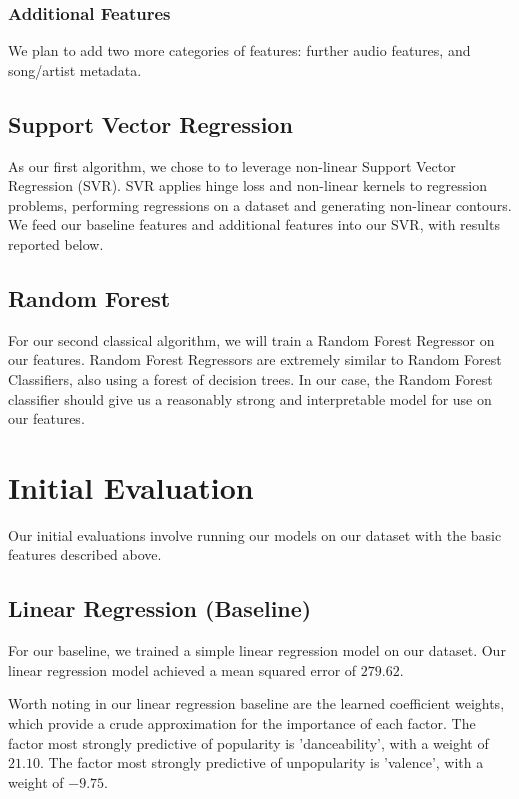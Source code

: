 \documentclass[journal]{IEEEtran}
\begin{document}
\subsubsection{Additional Features}
We plan to add two more categories of features: further audio features, and song/artist metadata.

\subsection{Support Vector Regression}
As our first algorithm, we chose to to leverage non-linear Support Vector Regression (SVR). SVR applies hinge loss and non-linear kernels to regression problems, performing regressions on a dataset and generating non-linear contours. We feed our baseline features and additional features into our SVR, with results reported below.

\subsection{Random Forest}
For our second classical algorithm, we will train a Random Forest Regressor on our features. Random Forest Regressors are extremely similar to Random Forest Classifiers, also using a forest of decision trees. In our case, the Random Forest classifier should give us a reasonably strong and interpretable model for use on our features.

\section{Initial Evaluation}

Our initial evaluations involve running our models on our dataset with the basic features described above.

\subsection{Linear Regression (Baseline)}
For our baseline, we trained a simple linear regression model on our dataset. Our linear regression model achieved a mean squared error of $279.62$.

Worth noting in our linear regression baseline are the learned coefficient weights, which provide a crude approximation for the importance of each factor. The factor most strongly predictive of popularity is 'danceability', with a weight of $21.10$. The factor most strongly predictive of unpopularity is 'valence', with a weight of $-9.75$.
\end{document}
